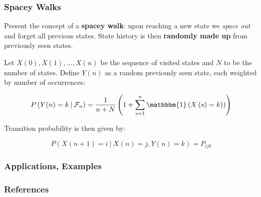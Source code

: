 \documentclass{beamer}
\begin{document}
\begin{frame}
\frametitle{Spacey Walks}

Present the concept of a \textbf{spacey walk}: upon reaching a new state we \textit{space out} and forget all previous states.  State history is then \textbf{randomly made up} from previously seen states.

\begin{block}{}

Let $X\left(0\right), X\left(1\right), \ldots, X\left(n\right)$ be the sequence of visited states and $N$ to be the number of states.  Define $Y\left(n\right)$ as a random previously seen state, each weighted by number of occurrences:

\begin{equation*}
P\left(Y(n) = k \:|\: \mathcal{F}_n \right) = \frac{1}{n+N}\left(1 + \sum_{s=1}^n \mathbbm{1}\left(X\left(s) = k\right) \right) \right)
\end{equation*}

Transition probability is then given by:

\begin{equation*}
P\left(X\left(n+1\right) = i \:|\: X(n) = j, Y(n) = k\right) = P_{ijk}
\end{equation*}


\end{block}

\end{frame}

\begin{frame}
\frametitle{Applications, Examples}
\end{frame}

\begin{frame}
\frametitle{References}
\nocite*{}


\end{frame}
\end{document}
